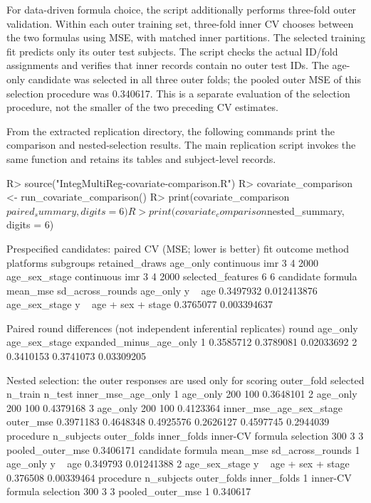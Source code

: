 \documentclass[article]{jss}
\begin{document}
For data-driven formula choice, the script additionally performs three-fold
outer validation. Within each outer training set, three-fold inner CV chooses
between the two formulas using MSE, with matched inner partitions. The selected
training fit predicts only its outer test subjects. The script checks the actual
ID/fold assignments and verifies that inner records contain no outer test IDs.
The age-only candidate was selected in all three outer folds; the pooled outer
MSE of this selection procedure was 0.340617. This is a separate evaluation of
the selection procedure, not the smaller of the two preceding CV estimates.

From the extracted replication directory, the following commands print the
comparison and nested-selection results. The main replication script invokes
the same function and retains its tables and subject-level records.
\begin{CodeInput}
R> source("IntegMultiReg-covariate-comparison.R")
R> covariate_comparison <- run_covariate_comparison()
R> print(covariate_comparison$paired_summary, digits = 6)
R> print(covariate_comparison$nested_summary, digits = 6)
\end{CodeInput}
\begin{CodeOutput}

Prespecified candidates: paired CV (MSE; lower is better)
           fit    outcome method platforms subgroups retained_draws
      age_only continuous    imr         3         4           2000
 age_sex_stage continuous    imr         3         4           2000
 selected_features
                 6
                 6
     candidate               formula  mean_mse sd_across_rounds
      age_only               y ~ age 0.3497932      0.012413876
 age_sex_stage y ~ age + sex + stage 0.3765077      0.003394637

Paired round differences (not independent inferential replicates)
 round  age_only age_sex_stage expanded_minus_age_only
     1 0.3585712     0.3789081              0.02033692
     2 0.3410153     0.3741073              0.03309205

Nested selection: the outer responses are used only for scoring
 outer_fold selected n_train n_test inner_mse_age_only
          1 age_only     200    100          0.3648101
          2 age_only     200    100          0.4379168
          3 age_only     200    100          0.4123364
 inner_mse_age_sex_stage outer_mse
               0.3971183 0.4648348
               0.4925576 0.2626127
               0.4597745 0.2944039
                  procedure n_subjects outer_folds inner_folds
 inner-CV formula selection        300           3           3
 pooled_outer_mse
        0.3406171
      candidate               formula mean_mse sd_across_rounds
1      age_only               y ~ age 0.349793       0.01241388
2 age_sex_stage y ~ age + sex + stage 0.376508       0.00339464
                   procedure n_subjects outer_folds inner_folds
1 inner-CV formula selection        300           3           3
  pooled_outer_mse
1         0.340617
\end{CodeOutput}
\end{document}
